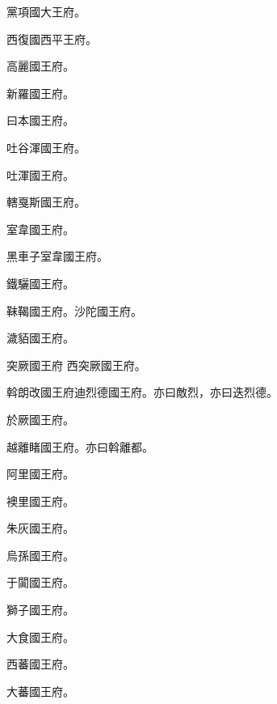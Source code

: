 \begin{pinyinscope}
 黨項國大王府。



 西復國西平王府。



 高麗國王府。



 新羅國王府。



 曰本國王府。



 吐谷渾國王府。



 吐渾國王府。



 轄戛斯國王府。



 室韋國王府。



 黑車子室韋國王府。



 鐵驪國王府。



 靺鞨國王府。沙陀國王府。



 濊貊國王府。



 突厥國王府
 西突厥國王府。



 斡朗改國王府迪烈德國王府。亦曰敵烈，亦曰迭烈德。



 於厥國王府。



 越離睹國王府。亦曰斡離都。



 阿里國王府。



 襖里國王府。



 朱灰國王府。



 烏孫國王府。



 于闐國王府。



 獅子國王府。



 大食國王府。



 西蕃國王府。



 大蕃國王府。




\end{pinyinscope}
